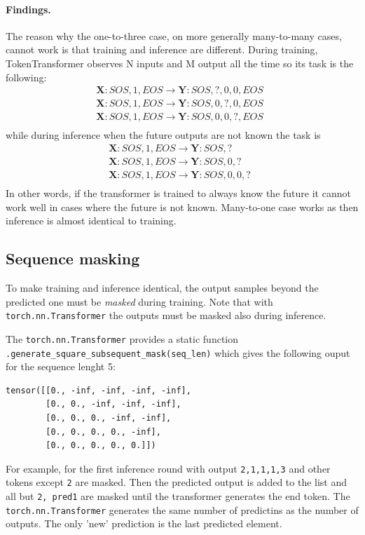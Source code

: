 \documentclass[final]{article}
\begin{document}
\paragraph{Findings.}
The reason why the one-to-three case, on more generally many-to-many cases, cannot work is that training and inference are different. During training, TokenTransformer observes N inputs and M output all the time so its task is the following:
\begin{displaymath}
  \begin{split}
    \mathbf{X}: SOS,1,EOS \rightarrow \mathbf{Y}: SOS,?, 0, 0,EOS\\
    \mathbf{X}: SOS,1,EOS \rightarrow \mathbf{Y}: SOS,0, ?, 0,EOS\\
    \mathbf{X}: SOS,1,EOS \rightarrow \mathbf{Y}: SOS,0, 0, ?,EOS\\
  \end{split} \enspace
\end{displaymath}
while during inference when the future outputs are not known the task is
\begin{displaymath}
  \begin{split}
    \mathbf{X}: SOS,1,EOS \rightarrow \mathbf{Y}: SOS,?\\
    \mathbf{X}: SOS,1,EOS \rightarrow \mathbf{Y}: SOS,0, ?\\
    \mathbf{X}: SOS,1,EOS \rightarrow \mathbf{Y}: SOS,0, 0, ?\\
  \end{split} \enspace
\end{displaymath}
In other words, if the transformer is trained to always know the future it cannot work well in cases where the future is not known. Many-to-one case works as then inference is almost identical to training.

\subsection{Sequence masking}
To make training and inference identical, the output samples beyond the predicted one must be \textit{masked} during training. Note that with \texttt{torch.nn.Transformer} the outputs must be masked also during inference.

The \texttt{torch.nn.Transformer} provides a static function
\texttt{.generate\_square\_subsequent\_mask(seq\_len)} which gives the following ouput for the sequence lenght 5:
\begin{verbatim}
tensor([[0., -inf, -inf, -inf, -inf],
        [0., 0., -inf, -inf, -inf],
        [0., 0., 0., -inf, -inf],
        [0., 0., 0., 0., -inf],
        [0., 0., 0., 0., 0.]])
\end{verbatim}
For example, for the first inference round with output \texttt{2,1,1,1,3} and other tokens except \texttt{2} are masked. Then the predicted output is added to the list and all but \texttt{2, pred1} are masked until the transformer generates the end token. The \texttt{torch.nn.Transformer} generates the same number of predictins as the number of outputs. The only 'new' prediction is the last predicted element. 
\end{document}
